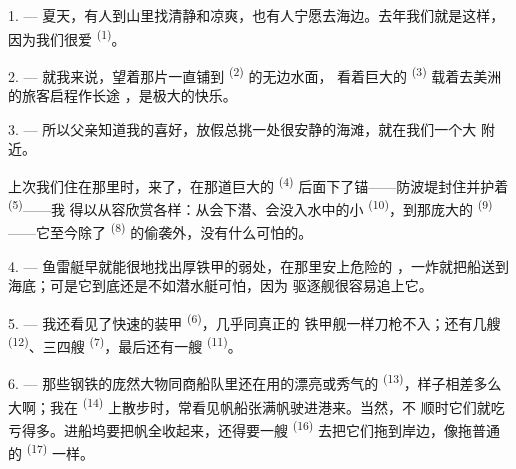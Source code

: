 %

\VUsaut{4.0mm}
\VUsaut{3.0mm}
\VUsaut{3.0mm}

1. --- 夏天，有人到山里找清静和凉爽，也有人宁愿去海边。去年我们就是这样，
因为我们很爱 \textsuperscript{(1)}。

2. --- 就我来说，望着那片一直铺到 \textsuperscript{(2)} 的无边水面，
看着巨大的 \textsuperscript{(3)} 载着去美洲的旅客启程作长途
，是极大的快乐。

3. --- 所以父亲知道我的喜好，放假总挑一处很安静的海滩，就在我们一个大
附近。

上次我们住在那里时，来了，在那道巨大的
\textsuperscript{(4)} 后面下了锚——防波堤封住并护着
\textsuperscript{(5)}——我
得以从容欣赏各样：从会下潜、会没入水中的小
\textsuperscript{(10)}，到那庞大的 \textsuperscript{(9)}——它至今除了
 \textsuperscript{(8)} 的偷袭外，没有什么可怕的。

\VUsaut{3.0mm}
\VUsaut{3.0mm}

4. --- 鱼雷艇早就能很地找出厚铁甲的弱处，在那里安上危险的
，一炸就把船送到海底；可是它到底还是不如潜水艇可怕，因为
驱逐舰很容易追上它。

5. --- 我还看见了快速的装甲 \textsuperscript{(6)}，几乎同真正的
铁甲舰一样刀枪不入；还有几艘 \textsuperscript{(12)}、三四艘
 \textsuperscript{(7)}，最后还有一艘 \textsuperscript{(11)}。

6. --- 那些钢铁的庞然大物同商船队里还在用的漂亮或秀气的
 \textsuperscript{(13)}，样子相差多么大啊；我在
\textsuperscript{(14)} 上散步时，常看见帆船张满帆驶进港来。当然，不
顺时它们就吃亏得多。进船坞要把帆全收起来，还得要一艘
\textsuperscript{(16)} 去把它们拖到岸边，像拖普通的 \textsuperscript{(17)}
一样。

